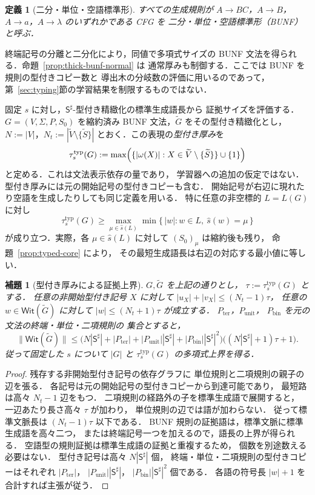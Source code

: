 \documentclass[11pt,a4paper]{ltjsarticle}
\newtheorem{lemma}[theorem]{補題}
\newtheorem{definition}[theorem]{定義}
\theoremstyle{remark}
\theoremstyle{plain}
\newcommand{\WitnessSet}{\mathsf{Wit}}
\begin{document}
\begin{definition}[二分・単位・空語標準形]
すべての生成規則が $A\to BC$，$A\to B$，
$A\to a$，$A\to\lambda$ のいずれかである CFG を
\emph{二分・単位・空語標準形}（BUNF）と呼ぶ．
\end{definition}
終端記号の分離と二分化により，同値で多項式サイズの
BUNF 文法を得られる．命題~\ref{prop:thick-bunf-normal} は
通常厚みも制御する．ここでは BUNF を規則の型付きコピー数と
導出木の分岐数の評価に用いるのであって，
第~\ref{sec:typing}節の学習結果を制限するものではない．

固定 $s$ に対し，$\mathsf S^\sharp$-型付き精緻化の標準生成語長から
証拠サイズを評価する．$G=(V,\Sigma,P,S_0)$ を縮約済み
BUNF 文法，$\widetilde G$ をその型付き精緻化とし，
$N:=|V|$，$N_t:=|\widetilde V\setminus\{\widetilde S\}|$
とおく．この表現の\emph{型付き厚み}を
\[
\tau_s^{\mathrm{typ}}(G):=
\max\Bigl(\{|\omega(X)|:
X\in\widetilde V\setminus\{\widetilde S\}\}\cup\{1\}\Bigr)
\]
と定める．これは文法表示依存の量であり，
学習器への追加の仮定ではない．
型付き厚みには元の開始記号の型付きコピーも含む．
開始記号が右辺に現れたり空語を生成したりしても同じ定義を用いる．
特に任意の非空標的 $L=L(G)$ に対し
\begin{equation}\tag{$\spadesuit$}\label{eq:typed-fiber-min}
 \tau_s^{\mathrm{typ}}(G)\ge
 \max_{\mu\in\widehat s(L)}
 \min\{\,|w|:w\in L,\ \widehat s(w)=\mu\,\}
\end{equation}
が成り立つ．実際，各 $\mu\in\widehat s(L)$ に対して
$(S_0)_\mu$ は縮約後も残り，
命題~\ref{prop:typed-core} により，
その最短生成語長は右辺の対応する最小値に等しい．

\begin{lemma}[型付き厚みによる証拠上界]
\label{lem:typed-thickness-bound}
$G,\widetilde G$ を上記の通りとし，
$\tau:=\tau_s^{\mathrm{typ}}(G)$ とする．
任意の非開始型付き記号 $X$ に対して
$|u_X|+|v_X|\le(N_t-1)\tau$，
任意の $w\in\WitnessSet(\widetilde G)$ に対して
$|w|\le(N_t+1)\tau$ が成立する．
$P_{\mathrm{ter}}$，$P_{\mathrm{unit}}$，
$P_{\mathrm{bin}}$ を元の文法の終端・単位・二項規則の
集合とすると，
\[
\|\WitnessSet(\widetilde G)\|
\le\bigl(N|\mathsf S^\sharp|+|P_{\mathrm{ter}}|
+|P_{\mathrm{unit}}||\mathsf S^\sharp|
+|P_{\mathrm{bin}}||\mathsf S^\sharp|^2\bigr)
\bigl((N|\mathsf S^\sharp|+1)\tau+1\bigr).
\]
従って固定した $s$ について
$|G|$ と $\tau_s^{\mathrm{typ}}(G)$ の多項式上界を得る．
\end{lemma}
\begin{proof}
残存する非開始型付き記号の依存グラフに
単位規則と二項規則の親子の辺を張る．
各記号は元の開始記号の型付きコピーから到達可能であり，
最短路は高々 $N_t-1$ 辺をもつ．
二項規則の経路外の子を標準生成語で展開すると，
一辺あたり長さ高々 $\tau$ が加わり，
単位規則の辺では語が加わらない．
従って標準文脈長は $(N_t-1)\tau$ 以下である．
BUNF 規則の証拠語は，標準文脈に標準生成語を高々二つ，
または終端記号一つを加えるので，語長の上界が得られる．
空語型の規則証拠は標準生成語の証拠と重複するため，
個数を別途数える必要はない．
型付き記号は高々 $N|\mathsf S^\sharp|$ 個，
終端・単位・二項規則の型付きコピーはそれぞれ
$|P_{\mathrm{ter}}|$，
$|P_{\mathrm{unit}}||\mathsf S^\sharp|$，
$|P_{\mathrm{bin}}||\mathsf S^\sharp|^2$ 個である．
各語の符号長 $|w|+1$ を合計すれば主張が従う．
\end{proof}
\end{document}
